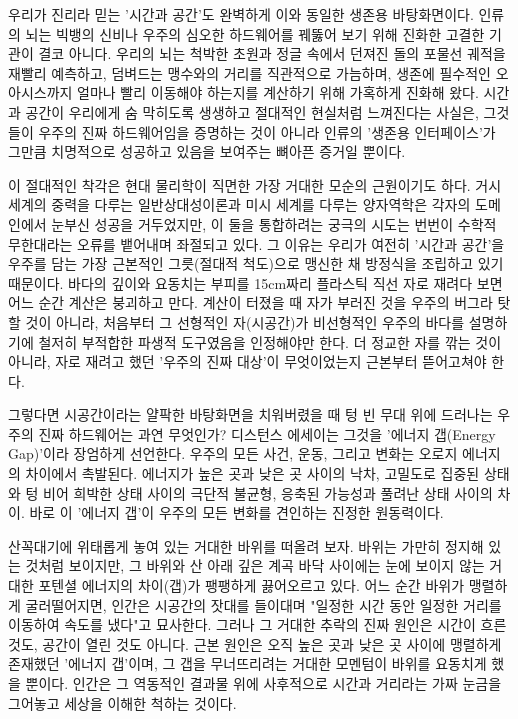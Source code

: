 우리가 진리라 믿는 '시간과 공간'도 완벽하게 이와 동일한 생존용 바탕화면이다. 인류의 뇌는 빅뱅의 신비나 우주의 심오한 하드웨어를 꿰뚫어 보기 위해 진화한 고결한 기관이 결코 아니다. 우리의 뇌는 척박한 초원과 정글 속에서 던져진 돌의 포물선 궤적을 재빨리 예측하고, 덤벼드는 맹수와의 거리를 직관적으로 가늠하며, 생존에 필수적인 오아시스까지 얼마나 빨리 이동해야 하는지를 계산하기 위해 가혹하게 진화해 왔다. 시간과 공간이 우리에게 숨 막히도록 생생하고 절대적인 현실처럼 느껴진다는 사실은, 그것들이 우주의 진짜 하드웨어임을 증명하는 것이 아니라 인류의 '생존용 인터페이스'가 그만큼 치명적으로 성공하고 있음을 보여주는 뼈아픈 증거일 뿐이다.

이 절대적인 착각은 현대 물리학이 직면한 가장 거대한 모순의 근원이기도 하다. 거시 세계의 중력을 다루는 일반상대성이론과 미시 세계를 다루는 양자역학은 각자의 도메인에서 눈부신 성공을 거두었지만, 이 둘을 통합하려는 궁극의 시도는 번번이 수학적 무한대라는 오류를 뱉어내며 좌절되고 있다. 그 이유는 우리가 여전히 '시간과 공간'을 우주를 담는 가장 근본적인 그릇(절대적 척도)으로 맹신한 채 방정식을 조립하고 있기 때문이다. 바다의 깊이와 요동치는 부피를 15cm짜리 플라스틱 직선 자로 재려다 보면 어느 순간 계산은 붕괴하고 만다. 계산이 터졌을 때 자가 부러진 것을 우주의 버그라 탓할 것이 아니라, 처음부터 그 선형적인 자(시공간)가 비선형적인 우주의 바다를 설명하기에 철저히 부적합한 파생적 도구였음을 인정해야만 한다. 더 정교한 자를 깎는 것이 아니라, 자로 재려고 했던 '우주의 진짜 대상'이 무엇이었는지 근본부터 뜯어고쳐야 한다.

그렇다면 시공간이라는 얄팍한 바탕화면을 치워버렸을 때 텅 빈 무대 위에 드러나는 우주의 진짜 하드웨어는 과연 무엇인가? 디스턴스 에세이는 그것을 '에너지 갭(Energy Gap)'이라 장엄하게 선언한다. 우주의 모든 사건, 운동, 그리고 변화는 오로지 에너지의 차이에서 촉발된다. 에너지가 높은 곳과 낮은 곳 사이의 낙차, 고밀도로 집중된 상태와 텅 비어 희박한 상태 사이의 극단적 불균형, 응축된 가능성과 풀려난 상태 사이의 차이. 바로 이 '에너지 갭'이 우주의 모든 변화를 견인하는 진정한 원동력이다.

산꼭대기에 위태롭게 놓여 있는 거대한 바위를 떠올려 보자. 바위는 가만히 정지해 있는 것처럼 보이지만, 그 바위와 산 아래 깊은 계곡 바닥 사이에는 눈에 보이지 않는 거대한 포텐셜 에너지의 차이(갭)가 팽팽하게 끓어오르고 있다. 어느 순간 바위가 맹렬하게 굴러떨어지면, 인간은 시공간의 잣대를 들이대며 "일정한 시간 동안 일정한 거리를 이동하여 속도를 냈다"고 묘사한다. 그러나 그 거대한 추락의 진짜 원인은 시간이 흐른 것도, 공간이 열린 것도 아니다. 근본 원인은 오직 높은 곳과 낮은 곳 사이에 맹렬하게 존재했던 '에너지 갭'이며, 그 갭을 무너뜨리려는 거대한 모멘텀이 바위를 요동치게 했을 뿐이다. 인간은 그 역동적인 결과물 위에 사후적으로 시간과 거리라는 가짜 눈금을 그어놓고 세상을 이해한 척하는 것이다.

